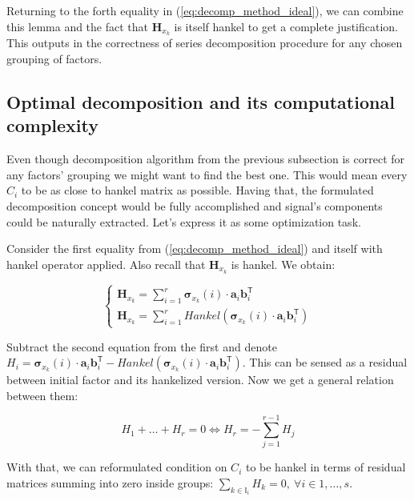 \documentclass[referee, pdflatex, sn-mathphys-num]{sn-jnl}
\theoremstyle{definition}
\theoremstyle{plain}
\begin{document}
	Returning to the forth equality in (\ref{eq:decomp_method_ideal}), we can combine this lemma and the fact that $ \mathbf{H}_{x_k} $ is itself hankel to get a complete justification. This outputs in the correctness of series decomposition procedure for any chosen grouping of factors.
	
	\subsection{Optimal decomposition and its computational complexity}\label{sec:optimal_decomp}
	
	Even though decomposition algorithm from the previous subsection is correct for any factors' grouping we might want to find the best one. This would mean every $ C_i $ to be as close to hankel matrix as possible. Having that, the formulated decomposition concept would be fully accomplished and signal's components could be naturally extracted. Let's express it as some optimization task.
	
	Consider the first equality from (\ref{eq:decomp_method_ideal}) and itself with hankel operator applied. Also recall that $ \mathbf{H}_{x_k} $ is hankel. We obtain:
	
	\begin{equation*}
		\begin{cases*}
			\mathbf{H}_{x_k} = \sum\limits_{i = 1}^{r} \boldsymbol{\sigma}_{x_k}(i) \cdot \mathbf{a}_i  \mathbf{b}_i^{\mathsf{T}} \\
			\mathbf{H}_{x_k} = \sum\limits_{i = 1}^{r} Hankel(\boldsymbol{\sigma}_{x_k}(i) \cdot \mathbf{a}_i  \mathbf{b}_i^{\mathsf{T}})
		\end{cases*}
	\end{equation*}
	
	Subtract the second equation from the first and denote $ H_i = \boldsymbol{\sigma}_{x_k}(i) \cdot \mathbf{a}_i  \mathbf{b}_i^{\mathsf{T}} - Hankel(\boldsymbol{\sigma}_{x_k}(i) \cdot \mathbf{a}_i  \mathbf{b}_i^{\mathsf{T}}) $. This can be sensed as a residual between initial factor and its hankelized version. Now we get a general relation between them:
	
	\begin{equation}\label{eq:residuals_equation}
		H_1 + \ldots + H_r = 0 \Leftrightarrow H_r = - \sum\limits_{j = 1}^{r - 1} H_j
	\end{equation}
	
	With that, we can reformulated condition on $ C_i $ to be hankel in terms of residual matrices summing into zero inside groups: $ \sum_{k \in \mathbb{I}_i} H_k = 0, \  \forall i \in 1, \ldots, s $.
	
\end{document}
